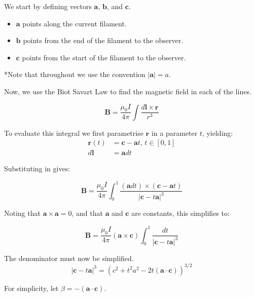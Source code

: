 We start by defining vectors $\mathbf{a}$, $\mathbf{b}$, and $\mathbf{c}$. 
\begin{itemize}
  \item $\mathbf{a}$ points along the current filament. 
  \item $\mathbf{b}$ points from the end of the filament to the observer.
  \item $\mathbf{c}$ points from the start of the filament to the observer.
\end{itemize}

*Note that throughout we use the convention $\left \vert \mathbf{a} \right \vert = a$.

Now, we use the Biot Savart Law to find the magnetic field in each of the lines. 

\begin{equation*}
  \mathbf{B} = \frac{\mu_0 I}{4\pi} \int \frac{d\mathbf{l}\times \mathbf{r}}{r^3}  
\end{equation*}

To evaluate this integral we first parametrise $\mathbf{r}$ in a parameter $t$, yielding:
\begin{align*}
  \mathbf{r}(t) &= \mathbf{c} - \mathbf{a}t \text{, } t \in [0,1] \\
  d\mathbf{l} &= \mathbf{a}dt
\end{align*}

Substituting in gives:

\begin{equation*}
  \mathbf{B} = \frac{\mu_0 I}{4\pi} \int_{0}^{1} \frac{(\mathbf{a}dt)\times (\mathbf{c} - \mathbf{a}t)}{\left \vert \mathbf{c} -  t\mathbf{a}\right\vert^3}
\end{equation*}

Noting that $\mathbf{a} \times \mathbf{a} = 0$, and that $\mathbf{a}$ and $\mathbf{c}$ are constants, this simplifies to:

\begin{equation*} 
  \mathbf{B} = \frac{\mu_0 I}{4\pi}(\mathbf{a} \times \mathbf{c}) \int_{0}^{1}  \frac{dt}{\left \vert \mathbf{c} -  t\mathbf{a}\right\vert^3}
\end{equation*}

The denominator must now be simplified.
\begin{equation*}
  \left\vert \mathbf{c} - t\mathbf{a} \right \vert ^3 = \left( c^2 + t^2a^2 - 2t(\mathbf{a}\cdot \mathbf{c}) \right)^{3/2}
\end{equation*}

For simplicity, let $\beta = -(\mathbf{a} \cdot \mathbf{c})$.

